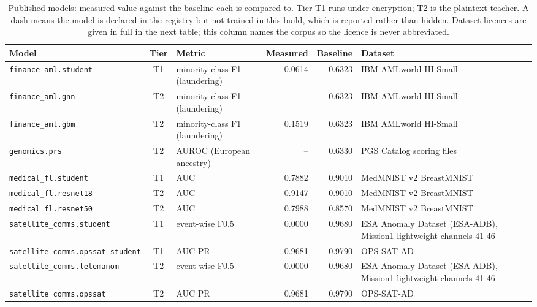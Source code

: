 \begin{table}[htbp]\centering\small
\caption{Published models: measured value against the baseline each is compared to. Tier T1 runs under encryption; T2 is the plaintext teacher. A dash means the model is declared in the registry but not trained in this build, which is reported rather than hidden. Dataset licences are given in full in the next table; this column names the corpus so the licence is never abbreviated.}
\begin{tabularx}{\textwidth}{@{}>{\raggedright\arraybackslash}p{3.3cm} c >{\raggedright\arraybackslash}X r r >{\raggedright\arraybackslash}X@{}}
\toprule
\textbf{Model} & \textbf{Tier} & \textbf{Metric} & \textbf{Measured} & \textbf{Baseline} & \textbf{Dataset} \\
\midrule
\texttt{finance\_\allowbreak{}aml.\allowbreak{}student} & T1 & minority-class F1 (laundering) & 0.0614 & 0.6323 & IBM AMLworld HI-Small \\
\texttt{finance\_\allowbreak{}aml.\allowbreak{}gnn} & T2 & minority-class F1 (laundering) & -- & 0.6323 & IBM AMLworld HI-Small \\
\texttt{finance\_\allowbreak{}aml.\allowbreak{}gbm} & T2 & minority-class F1 (laundering) & 0.1519 & 0.6323 & IBM AMLworld HI-Small \\
\texttt{genomics.\allowbreak{}prs} & T2 & AUROC (European ancestry) & -- & 0.6330 & PGS Catalog scoring files \\
\texttt{medical\_\allowbreak{}fl.\allowbreak{}student} & T1 & AUC & 0.7882 & 0.9010 & MedMNIST v2 BreastMNIST \\
\texttt{medical\_\allowbreak{}fl.\allowbreak{}resnet18} & T2 & AUC & 0.9147 & 0.9010 & MedMNIST v2 BreastMNIST \\
\texttt{medical\_\allowbreak{}fl.\allowbreak{}resnet50} & T2 & AUC & 0.7988 & 0.8570 & MedMNIST v2 BreastMNIST \\
\texttt{satellite\_\allowbreak{}comms.\allowbreak{}student} & T1 & event-wise F0.5 & 0.0000 & 0.9680 & ESA Anomaly Dataset (ESA-ADB), Mission1 lightweight channels 41-46 \\
\texttt{satellite\_\allowbreak{}comms.\allowbreak{}opssat\_\allowbreak{}student} & T1 & AUC PR & 0.9681 & 0.9790 & OPS-SAT-AD \\
\texttt{satellite\_\allowbreak{}comms.\allowbreak{}telemanom} & T2 & event-wise F0.5 & 0.0000 & 0.9680 & ESA Anomaly Dataset (ESA-ADB), Mission1 lightweight channels 41-46 \\
\texttt{satellite\_\allowbreak{}comms.\allowbreak{}opssat} & T2 & AUC PR & 0.9681 & 0.9790 & OPS-SAT-AD \\

\end{tabularx}
\end{table}
